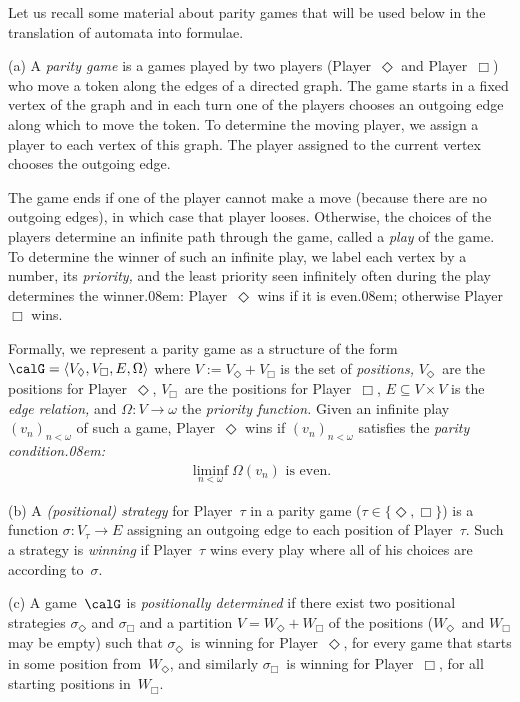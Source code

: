 \documentclass[10pt, fleqn]{scrartcl}
\newcommand*{\?}{\kern .08em}
\begin{document}
Let us recall some material about parity games that will be used below in the translation
of automata into formulae.
\begin{Def}
(a)
A \emph{parity game} is a games played by two players (Player~$\Diamond$ and Player~$\Box$)
who move a token along the edges of a directed graph.
The game starts in a fixed vertex of the graph and in each turn one of the players chooses
an outgoing edge along which to move the token. To determine the moving player,
we assign a player to each vertex of this graph. The player assigned
to the current vertex chooses the outgoing edge.

The game ends if one of the player cannot make a move (because there are no outgoing edges),
in which case that player looses. Otherwise, the choices of the players determine
an infinite path through the game, called a \emph{play} of the game.
To determine the winner of such an infinite play, we label each vertex by a number,
its \emph{priority,} and the least priority seen infinitely often during the play
determines the winner\?: Player~$\Diamond$ wins if it is even\?; otherwise Player~$\Box$ wins.

Formally, we represent a parity game as a structure of the form
$\calG = \langle V_\Diamond,V_\Box,E,\Omega\rangle$
where $V := V_\Diamond + V_\Box$ is the set of \emph{positions,}
$V_\Diamond$~are the positions for Player~$\Diamond$,
$V_\Box$~are the positions for Player~$\Box$,
$E \subseteq V \times V$ is the \emph{edge relation,} and $\Omega : V \to \omega$
the \emph{priority function.}
Given an infinite play $(v_n)_{n<\omega}$ of such a game, Player~$\Diamond$ wins if
$(v_n)_{n<\omega}$ satisfies the \emph{parity condition\?:}
\begin{align*}
  \liminf_{n<\omega} \Omega(v_n) \text{ is even.}
\end{align*}

(b) A \emph{(positional) strategy} for Player~$\tau$ in a parity game
($\tau \in \{\Diamond,\Box\}$) is a function $\sigma : V_\tau \to E$
assigning an outgoing edge to each position of Player~$\tau$.
Such a strategy is \emph{winning} if Player~$\tau$ wins every play where all of his
choices are according to~$\sigma$.

(c) A game~$\calG$ is \emph{positionally determined} if there exist
two positional strategies $\sigma_\Diamond$ and $\sigma_\Box$ and a partition
$V = W_\Diamond + W_\Box$ of the positions ($W_\Diamond$~and $W_\Box$ may be empty) such that
$\sigma_\Diamond$~is winning for Player~$\Diamond$, for every game that starts in some
position from~$W_\Diamond$, and similarly $\sigma_\Box$~is winning for Player~$\Box$,
for all starting positions in~$W_\Box$.
\end{Def}
\end{document}
